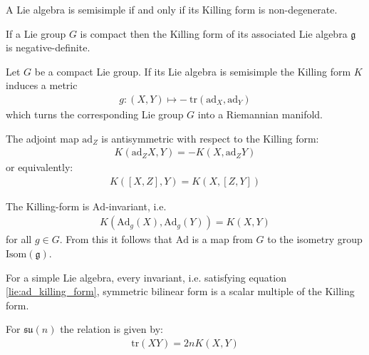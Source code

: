 	\begin{theorem}
		A Lie algebra is semisimple if and only if its Killing form is non-degenerate.
	\end{theorem}

	\begin{property}
		If a Lie group $G$ is compact then the Killing form of its associated Lie algebra $\mathfrak{g}$ is negative-definite.
	\end{property}
	\begin{result}
		Let $G$ be a compact Lie group. If its Lie algebra is semisimple the Killing form $K$ induces a metric
                \begin{gather}
                	g:(X, Y)\mapsto -\ \text{tr}(\text{ad}_X, \text{ad}_Y)
                \end{gather}
                which turns the corresponding Lie group $G$ into a Riemannian manifold.
	\end{result}
            
	\begin{property}
		The adjoint map $\text{ad}_Z$ is antisymmetric with respect to the Killing form:
		\begin{gather}
			\label{lie:ad_killing_form}
			K(\text{ad}_ZX, Y) = -K(X, \text{ad}_ZY)
		\end{gather}
		or equivalently:
		\begin{gather}
			K([X, Z], Y) = K(X, [Z, Y])
		\end{gather}
	\end{property}
	\begin{property}
		The Killing-form is $\text{Ad}$-invariant, i.e.
                \begin{gather}
                    K(\text{Ad}_g(X), \text{Ad}_g(Y)) = K(X, Y)
		\end{gather}
                for all $g\in G$. From this it follows that $\text{Ad}$ is a map from $G$ to the isometry group $\text{Isom}(\mathfrak{g})$.
	\end{property}
	
	\begin{property}\label{lie:killing_trace}
		For a simple Lie algebra, every invariant, i.e. satisfying equation \ref{lie:ad_killing_form}, symmetric bilinear form is a scalar multiple of the Killing form.
	\end{property}
	\begin{example}
		For $\mathfrak{su}(n)$ the relation is given by:
		\begin{gather}
			\text{tr}(XY) = 2nK(X, Y)
		\end{gather}
	\end{example}
	
